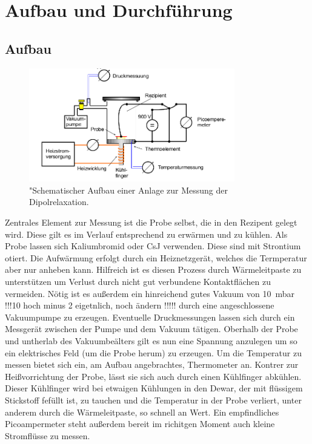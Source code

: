 \section{Aufbau und Durchführung}
\subsection{Aufbau}
\begin{figure}
    \centering
    \includegraphics[width=0.8\textwidth]{bilder/Aufbau.png}
    \caption{"Schematischer Aufbau einer Anlage zur Messung der Dipolrelaxation.
            \cite{skript}}
    \label{fig:aufbau}
\end{figure}

Zentrales Element zur Messung ist die Probe selbst, die in den Rezipent gelegt wird. Diese gilt es im Verlauf entsprechend
zu erwärmen und zu kühlen. Als Probe lassen sich Kaliumbromid oder CsJ verwenden. Diese sind mit Strontium
otiert. Die Aufwärmung erfolgt durch ein Heiznetzgerät, welches die Termperatur aber nur anheben kann.
Hilfreich ist es diesen Prozess durch Wärmeleitpaste zu unterstützen um
Verlust durch nicht gut verbundene Kontaktflächen zu vermeiden.
Nötig ist es außerdem ein hinreichend gutes Vakuum von \SI{10}{\milli\bar} !!!10 hoch minus 2 eigetnlich, noch ändern !!!!! 
durch eine angeschlossene Vakuumpumpe zu erzeugen.
Eventuelle Druckmessungen  lassen sich durch ein Messgerät zwischen der Pumpe und dem Vakuum tätigen.
Oberhalb der Probe und untherlab des Vakuumbeälters gilt es nun eine Spannung anzulegen um so ein 
elektrisches Feld (um die Probe herum) zu erzeugen. Um die Temperatur zu messen bietet sich ein, am Aufbau angebrachtes, Thermometer an.
Kontrer zur Heißvorrichtung der Probe, lässt sie sich auch durch einen Kühlfinger abkühlen.
Dieser Kühlfinger wird bei etwaigen Kühlungen in den Dewar, 
der mit flüssigem Stickstoff fefüllt ist, 
zu tauchen und die Temperatur in der Probe verliert, unter anderem durch die Wärmeleitpaste, so schnell an Wert.
Ein empfindliches Picoampermeter steht außerdem bereit im richitgen Moment auch kleine
Stromflüsse zu messen.

